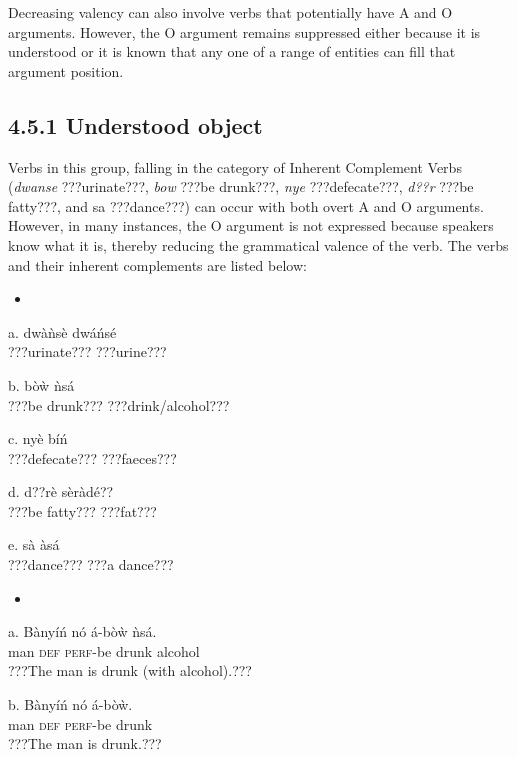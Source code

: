 \documentclass[output=paper]{langsci/langscibook}
\begin{document}
Decreasing valency can also involve verbs that potentially have A and O arguments. However, the O argument remains suppressed either because it is understood or it is known that any one of a range of entities can fill that argument position.

\subsection{4.5.1  Understood object}

Verbs in this group, falling in the category of Inherent Complement Verbs (\emph{dwanse} ???urinate???, \emph{bow} ???be drunk???, \emph{nye} ???defecate???, \emph{d??r} ???be fatty???, and sa ???dance???) can occur with both overt A and O arguments. However, in many instances, the O argument is not expressed because speakers know what it is, thereby reducing the grammatical valence of the verb. The verbs and their inherent complements are listed below:

\begin{itemize}
\item \end{itemize}
\gll a.  dw\`{a}\`{n}s\`{e}   dw\'{a}\'{n}s\'{e}\\
\glt   ???urinate???  ???urine???
\z

\gll  b.  b\`{o}\`{w}    \`{n}s\'{a}\\
\glt   ???be drunk???  ???drink/alcohol???
\z

\gll  c.  ny\`{e}    b\'{i}\'{n}\\
\glt   ???defecate???  ???faeces???
\z

\gll  d.  d??r\`{e}    s\`{e}r\`{a}d\'{e}??\\
\glt   ???be fatty???  ???fat???
\z

\gll  e.  s\`{a}    \`{a}s\'{a}\\
\glt   ???dance???    ???a dance???
\z

\begin{itemize}
\item \end{itemize}
\gll a.  B\`{a}ny\'{i}\'{n}  n\'{o}  \'{a}-b\`{o}\`{w}    \`{n}s\'{a}.\\
       man  \textsc{def}  \textsc{perf}{}-be drunk  alcohol\\
\glt ???The man is drunk (with alcohol).???
\z

\gll  b.  B\`{a}ny\'{i}\'{n}  n\'{o}  \'{a}-b\`{o}\`{w}.\\
       man  \textsc{def}  \textsc{perf}{}-be drunk\\
\glt ???The man is drunk.???
\z
\end{document}
